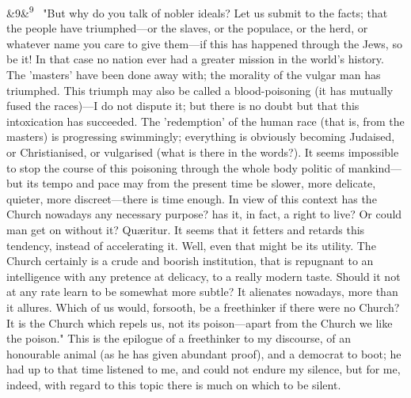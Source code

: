 \documentclass[12pt]{article}
\newcommand{\para}[1][]{\par\noindent\ifx&#1&\else\textsuperscript{\footnotesize #1}~\fi}
\begin{document}
\para[9] "But why do you talk of nobler ideals? Let us submit to the facts; that the people have triumphed---or the slaves, or the populace, or the herd, or whatever name you care to give them---if this has happened through the Jews, so be it! In that case no nation ever had a greater mission in the world's history. The 'masters' have been done away with; the morality of the vulgar man has triumphed. This triumph may also be called a blood-poisoning (it has mutually fused the races)---I do not dispute it; but there is no doubt but that this intoxication has succeeded. The 'redemption' of the human race (that is, from the masters) is progressing swimmingly; everything is obviously becoming Judaised, or Christianised, or vulgarised (what is there in the words?). It seems impossible to stop the course of this poisoning through the whole body politic of mankind---but its tempo and pace may from the present time be slower, more delicate, quieter, more discreet---there is time enough. In view of this context has the Church nowadays any necessary purpose? has it, in fact, a right to live? Or could man get on without it? Quæritur. It seems that it fetters and retards this tendency, instead of accelerating it. Well, even that might be its utility. The Church certainly is a crude and boorish institution, that is repugnant to an intelligence with any pretence at delicacy, to a really modern taste. Should it not at any rate learn to be somewhat more subtle? It alienates nowadays, more than it allures. Which of us would, forsooth, be a freethinker if there were no Church? It is the Church which repels us, not its poison---apart from the Church we like the poison." This is the epilogue of a freethinker to my discourse, of an honourable animal (as he has given abundant proof), and a democrat to boot; he had up to that time listened to me, and could not endure my silence, but for me, indeed, with regard to this topic there is much on which to be silent.
\end{document}
